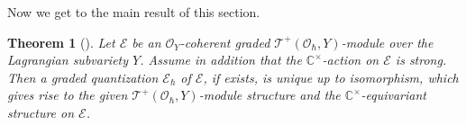 \documentclass[12pt]{amsart}
\newcommand{\C}{\mathbb{C}}
\newcommand{\TT}{\mathscr{T}}
\newcommand{\tatp}{\TT^+(\Q, Y)}
\newcommand{\cm}{\C^\times}
\newcommand{\OO}{\mathcal{O}}
\newcommand{\Q}{\OO_\hbar}
\newcommand{\EE}{\mathcal{E}}
\newcommand{\coh}{\operatorname{Coh}}
\newtheorem{Thm}{Theorem}[subsection]
\newtheorem{Lem}[Thm]{Lemma}
\theoremstyle{definition}
\numberwithin{equation}{section}
\begin{document}

Now we get to the main result of this section.

\begin{Thm}[{\cite[Thm 4.3.3]{LY}}] \label{thm:quan_lag}
	Let $\EE$ be an $\OO_Y$-coherent graded $\tatp$-module over the Lagrangian subvariety $Y$.  Assume in addition that the $\cm$-action on $\EE$ is strong. Then a graded quantization $\EE_\hbar$ of $\EE$, if exists, is unique up to isomorphism, which gives rise to the given $\tatp$-module structure and the $\cm$-equivariant structure on $\EE$.
\end{Thm}
\end{document}
